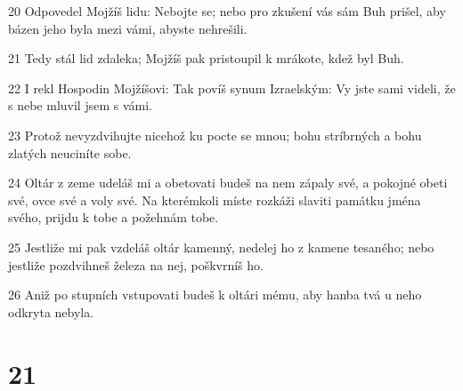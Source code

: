 \par 20 Odpovedel Mojžíš lidu: Nebojte se; nebo pro zkušení vás sám Buh prišel, aby bázen jeho byla mezi vámi, abyste nehrešili.
\par 21 Tedy stál lid zdaleka; Mojžíš pak pristoupil k mrákote, kdež byl Buh.
\par 22 I rekl Hospodin Mojžíšovi: Tak povíš synum Izraelským: Vy jste sami videli, že s nebe mluvil jsem s vámi.
\par 23 Protož nevyzdvihujte nicehož ku pocte se mnou; bohu stríbrných a bohu zlatých neuciníte sobe.
\par 24 Oltár z zeme udeláš mi a obetovati budeš na nem zápaly své, a pokojné obeti své, ovce své a voly své. Na kterémkoli míste rozkáži slaviti památku jména svého, prijdu k tobe a požehnám tobe.
\par 25 Jestliže mi pak vzdeláš oltár kamenný, nedelej ho z kamene tesaného; nebo jestliže pozdvihneš železa na nej, poškvrníš ho.
\par 26 Aniž po stupních vstupovati budeš k oltári mému, aby hanba tvá u neho odkryta nebyla.

\chapter{21}

